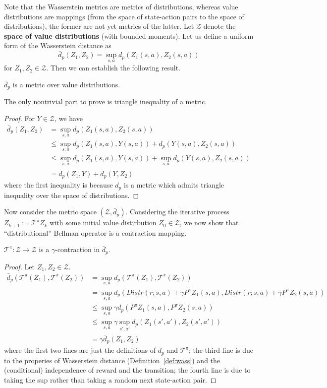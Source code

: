 \documentclass{article}
\begin{document}
Note that the Wasserstein metrics are metrics of distributions, whereas value distributions are mappings (from the space of state-action pairs to the space of distributions), the former are not yet metrics of the latter.
Let $\mathcal{Z}$ denote the \textbf{space of value distributions} (with bounded moments).
Let us define a uniform form of the Wasserstein distance as 
$$\bar{d}_p(Z_1,Z_2) = \sup_{s,a} d_p(Z_1(s,a), Z_2(s,a))$$
for $Z_1,Z_2\in\mathcal{Z}$.
Then we can establish the following result.
\begin{lem}
$\bar{d}_p$ is a metric over value distributions.
\end{lem}
The only nontrivial part to prove is triangle inequality of a metric.
\begin{proof}
For $Y\in\mathcal{Z}$, we have 
\begin{align*}
\bar{d}_p(Z_1,Z_2) &= \sup_{s,a} d_p(Z_1(s,a), Z_2(s,a)) \\
&\leq \sup_{s,a} d_p(Z_1(s,a), Y(s,a))+ d_p(Y(s,a), Z_2(s,a)) \\
&\leq \sup_{s,a} d_p(Z_1(s,a), Y(s,a))+ \sup_{s,a} d_p(Y(s,a), Z_2(s,a)) \\
&= \bar{d}_p(Z_1,Y)+\bar{d}_p(Y,Z_2)
\end{align*}
where the first inequality is because $d_p$ is a metric which admits triangle inequality over the space of distributions.
\end{proof}


Now consider the metric space $(\mathcal{Z}, \bar{d}_p)$. 
Considering the iterative process $Z_{k+1}:=\mathcal{T}^\pi Z_k$ with some initial value distirbution $Z_0\in\mathcal{Z}$, we now show that ``distributional'' Bellman operator is a contraction mapping. 
\begin{lem}
$\mathcal{T}^\pi:\mathcal{Z}\rightarrow\mathcal{Z}$ is a $\gamma$-contraction in $\bar{d}_p$.
\end{lem}
\begin{proof}
Let $Z_1,Z_2\in\mathcal{Z}$. 
\begin{align*}
\bar{d}_p(\mathcal{T}^\pi(Z_1),\mathcal{T}^\pi(Z_2)) &= \sup_{s,a} d_p(\mathcal{T}^\pi(Z_1),\mathcal{T}^\pi(Z_2)) \\
&= \sup_{s,a} d_p(Distr(r; s,a) + \gamma P^\pi Z_1(s,a),Distr(r; s,a) + \gamma P^\pi Z_2(s,a)) \\
&\leq \sup_{s,a} \gamma d_p( P^\pi Z_1(s,a),P^\pi Z_2(s,a)) \\
&\leq \sup_{s,a} \gamma \sup_{s',a'} d_p(  Z_1(s',a'), Z_2(s',a')) \\
&= \gamma \bar{d}_p(Z_1, Z_2) 
\end{align*}
where the first two lines are just the definitions of $\bar{d}_p$ and $\mathcal{T}^\pi$; 
the third line is due to the properies of Wasserstein distance (Definition~\ref{def:wass}) and the (conditional) independence of reward and the transition; 
the fourth line is due to taking the sup rather than taking a random next state-action pair. 
\end{proof}
\end{document}
